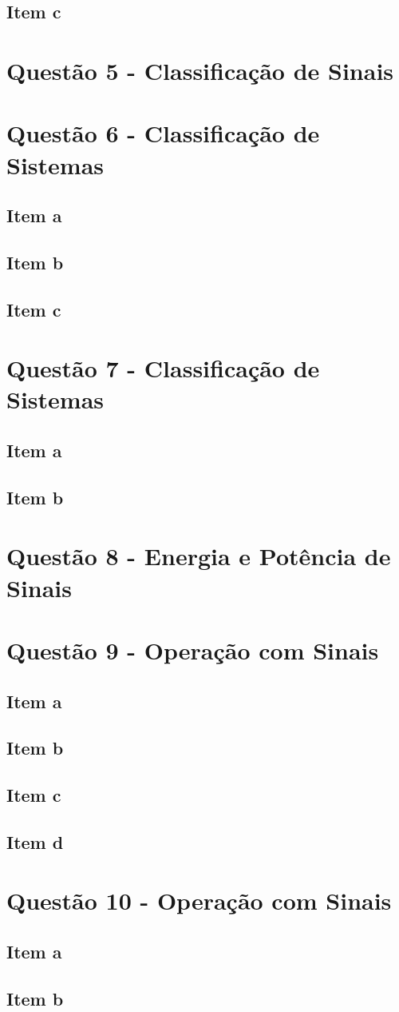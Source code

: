 \documentclass[a4paper, 12pt]{article}
\begin{document}
		\subsection{Item c}	
	\section{Quest\~{a}o 5 - Classificação de Sinais}		
	\section{Quest\~{a}o 6 - Classificação de Sistemas}			
		\subsection{Item a}	
		\subsection{Item b}	
		\subsection{Item c}		
	\section{Quest\~{a}o 7 - Classificação de Sistemas}			
		\subsection{Item a}	
		\subsection{Item b}			
	\section{Quest\~{a}o 8 - Energia e Potência de Sinais}	
	\section{Quest\~{a}o 9 - Operação com Sinais}
		\subsection{Item a}	
		\subsection{Item b}	
		\subsection{Item c}	
		\subsection{Item d}		
	\section{Quest\~{a}o 10 - Operação com Sinais}
		\subsection{Item a}	
		\subsection{Item b}					
		


		
\end{document}
